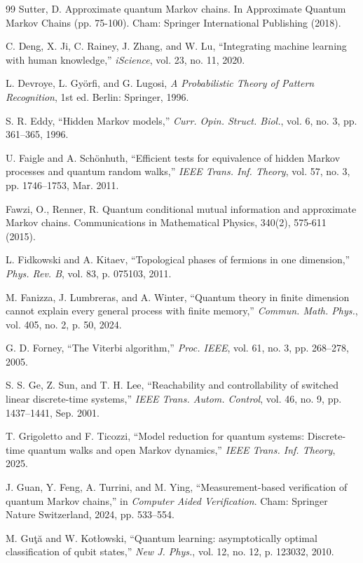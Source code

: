 \documentclass[12pt, reco]{article}
\begin{document}
\begin{thebibliography}{99}
 Sutter, D.  Approximate quantum Markov chains. In Approximate Quantum Markov Chains (pp. 75-100). Cham: Springer International Publishing  (2018).

C. Deng, X. Ji, C. Rainey, J. Zhang, and W. Lu, ``Integrating machine learning with human knowledge,'' \emph{iScience}, vol. 23, no. 11, 2020.

L. Devroye, L. Györfi, and G. Lugosi, \emph{A Probabilistic Theory of Pattern Recognition}, 1st ed. Berlin: Springer, 1996.

S. R. Eddy, ``Hidden Markov models,'' \emph{Curr. Opin. Struct. Biol.}, vol. 6, no. 3, pp. 361--365, 1996.

U. Faigle and A. Schönhuth, ``Efficient tests for equivalence of hidden Markov processes and quantum random walks,'' \emph{IEEE Trans. Inf. Theory}, vol. 57, no. 3, pp. 1746--1753, Mar. 2011.

 Fawzi, O.,   Renner, R.  Quantum conditional mutual information and approximate Markov chains. Communications in Mathematical Physics, 340(2), 575-611 (2015).

L. Fidkowski and A. Kitaev, ``Topological phases of fermions in one dimension,'' \emph{Phys. Rev. B}, vol. 83, p. 075103, 2011.

M. Fanizza, J. Lumbreras, and A. Winter, ``Quantum theory in finite dimension cannot explain every general process with finite memory,'' \emph{Commun. Math. Phys.}, vol. 405, no. 2, p. 50, 2024.

G. D. Forney, ``The Viterbi algorithm,'' \emph{Proc. IEEE}, vol. 61, no. 3, pp. 268--278, 2005.

S. S. Ge, Z. Sun, and T. H. Lee, ``Reachability and controllability of switched linear discrete-time systems,'' \emph{IEEE Trans. Autom. Control}, vol. 46, no. 9, pp. 1437--1441, Sep. 2001.

T. Grigoletto and F. Ticozzi, ``Model reduction for quantum systems: Discrete-time quantum walks and open Markov dynamics,'' \emph{IEEE Trans. Inf. Theory}, 2025.

J. Guan, Y. Feng, A. Turrini, and M. Ying, ``Measurement-based verification of quantum Markov chains,'' in \emph{Computer Aided Verification}. Cham: Springer Nature Switzerland, 2024, pp. 533--554.

M. Guţă and W. Kotłowski, ``Quantum learning: asymptotically optimal classification of qubit states,'' \emph{New J. Phys.}, vol. 12, no. 12, p. 123032, 2010.


\end{thebibliography}
\end{document}
